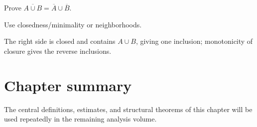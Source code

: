 \begin{exercise}\label{exr:ii04-expand-16}
Prove \(\overline{A\cup B}=\overline A\cup\overline B\).
\end{exercise}
\begin{hint}
Use closedness/minimality or neighborhoods.
\end{hint}
\begin{solution}
The right side is closed and contains \(A\cup B\), giving one inclusion; monotonicity of closure gives the reverse inclusions.
\end{solution}
\section*{Chapter summary}
The central definitions, estimates, and structural theorems of this chapter will be used repeatedly in the remaining analysis volume.
